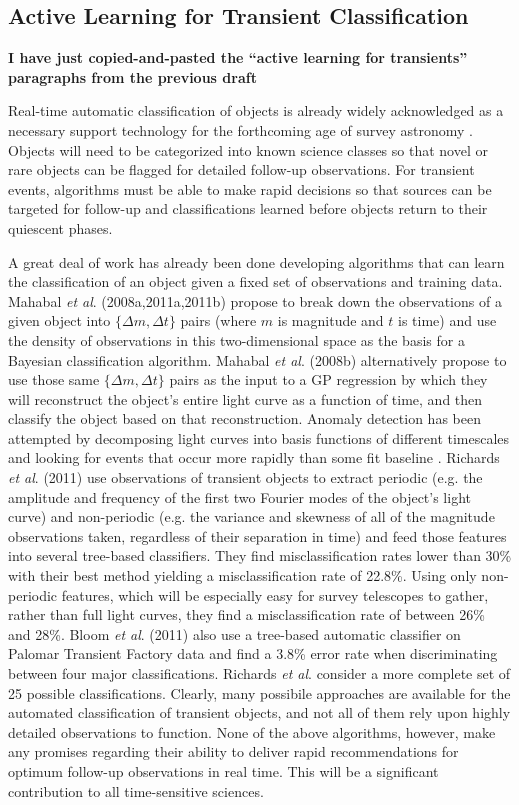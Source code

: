 \documentclass[useAMS,usenatbib,tightenlines,11pt,preprint]{aastex}
\begin{document}
\subsection{Active Learning for Transient Classification}


{\bf I have just copied-and-pasted the ``active learning for transients''
paragraphs from the previous draft}


Real-time automatic classification of objects is already widely acknowledged as a
necessary support technology for the forthcoming age of survey astronomy
\cite{djorgovski2011,richards2011,richards2012,graham2012,mahabal2008a,mahabal2011a}.
Objects will need to be categorized into known science classes so that novel
or rare objects can be flagged for detailed follow-up observations.
For transient events, algorithms must be able to make rapid
decisions so that sources can be targeted for follow-up 
and classifications learned before
objects return to their quiescent phases.  

A great deal of work has
already been done developing algorithms that can learn the classification of an
object given a fixed set of observations and training data.  
Mahabal {\it et al}. (2008a,2011a,2011b) propose to break down the
observations of a given object into $\{\Delta m,\Delta t\}$ pairs (where $m$
is magnitude and $t$ is time) and use the density of observations in this 
two-dimensional space as the basis for a Bayesian classification algorithm.
Mahabal {\it et al}. (2008b) alternatively propose to use those same 
$\{\Delta m,\Delta t\}$ pairs as the input to a GP regression
by which they will reconstruct the object's entire light curve as a function
of time, and then classify the object based on that reconstruction.
Anomaly detection has been attempted by decomposing light curves into
basis functions of different timescales and looking for events that occur
more rapidly than some fit baseline \cite{preston2009,blocker2013}.
Richards {\it et al}. (2011) use observations of transient objects to extract
periodic (e.g. the amplitude and frequency of the first two Fourier modes of
the object's light curve) and non-periodic (e.g. the variance and skewness of
all of the magnitude observations taken, regardless of their separation in
time) and feed those features into several tree-based classifiers.
They find misclassification rates lower than 30\% with their best method yielding a
misclassification rate of 22.8\%.  Using only non-periodic features, which will be
especially easy for survey telescopes to gather, rather than
full light curves, they 
find a misclassification rate of
between 26\% and 28\%.
Bloom {\it et al}. (2011) also use a tree-based automatic classifier on
Palomar Transient Factory data and find a 3.8\% error rate when
discriminating between four major classifications.  Richards {\it et al}.
consider a more complete set of 25 possible classifications.
Clearly, many possibile approaches are available for the automated
classification of transient objects, and not all of them rely upon highly
detailed observations to function.  
None of the above algorithms, however, make
any promises regarding their ability to deliver rapid recommendations for
optimum follow-up observations in real time.  This will be a significant
contribution to all time-sensitive sciences.
\end{document}
